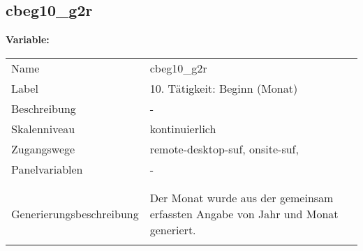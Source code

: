 	
	
	\subsection{cbeg10\_g2r}
	\label{subSection:cbeg10_g2r}

	\noindent\textbf{Variable:}\\
		\begin{tabular}{lL{11.3cm}}
			\label{tableVariable:cbeg10_g2r}
			Name & cbeg10\_g2r \\
			Label & 10. Tätigkeit: Beginn (Monat)  \\
			Beschreibung & - \\
			Skalenniveau & kontinuierlich \\
			Zugangswege &
				remote-desktop-suf,
				onsite-suf,
 \\
			Panelvariablen & -
			 \\
			 \\
 \\
					Generierungsbeschreibung & Der Monat wurde aus der gemeinsam erfassten Angabe von Jahr und Monat generiert. 
				 \\	
			 \\
		\end{tabular}





